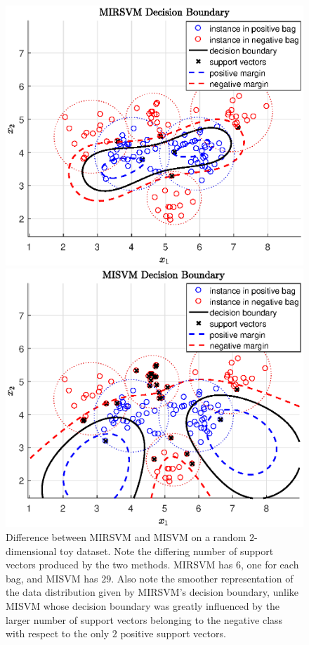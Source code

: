 \documentclass[reqno]{vcuthesis}
\numberwithin{equation}{chapter}
\begin{document}
\begin{figure}[t!]
    \centering
    \begin{minipage}{0.5\textwidth}
        \centering
        \includegraphics[width=\textwidth]{figures/mirsvm_figure.eps} %
    \end{minipage}\hfill
    \begin{minipage}{0.5\textwidth}
        \centering
        \includegraphics[width=\textwidth]{figures/misvm_figure.eps} %
    \end{minipage}
    \caption{Difference between MIRSVM and MISVM on a random $2$-dimensional toy dataset. Note the differing number of support vectors produced by the two methods. MIRSVM has $6$, one for each bag, and MISVM has $29$. Also note the smoother representation of the data distribution given by MIRSVM's decision boundary, unlike MISVM whose decision boundary was greatly influenced by the larger number of support vectors belonging to the negative class with respect to the only $2$ positive support vectors.}\label{fig:diff}
\end{figure}
\end{document}
